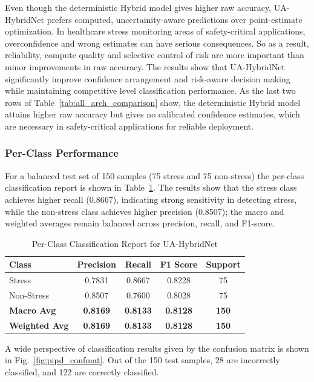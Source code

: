 \documentclass[conference]{IEEEtran}
\begin{document}
Even though the deterministic Hybrid model gives higher raw accuracy, UA-HybridNet prefers computed, uncertainity-aware predictions over point-estimate optimization. In healthcare stress monitoring areas of safety-critical applications, overconfidence and wrong estimates can have serious consequences. So as a result, reliability, compute quality and selective control of risk are more important than minor improvements in raw accuracy. The results show that UA-HybridNet significantly improve confidence arrangement and risk-aware decision making while maintaining competitive level classification performance. As the last two rows of Table~\ref{tab:all_arch_comparison} show, the deterministic Hybrid model attains higher raw accuracy but gives no calibrated confidence estimates, which are necessary in safety-critical applications for reliable deployment.

\subsubsection{Per-Class Performance}
For a balanced test set of 150 samples (75 stress and 75 non-stress) the per-class classification report is shown in Table~\ref{tab:perclass_pipelineD}. The results show that the stress class achieves higher recall (0.8667), indicating strong sensitivity in detecting stress, while the non-stress class achieves higher precision (0.8507); the macro and weighted averages remain balanced across precision, recall, and F1-score.
\begin{table}[tb]
\centering
\caption{Per-Class Classification Report for UA-HybridNet}
\label{tab:perclass_pipelineD}
\footnotesize
\setlength{\tabcolsep}{3pt}
\renewcommand{\arraystretch}{1.0}
\begin{tabular}{lcccc}
\hline
\textbf{Class} & \textbf{Precision} & \textbf{Recall} & \textbf{F1 Score} & \textbf{Support} \\
\hline
Stress     & 0.7831 & 0.8667 & 0.8228 & 75 \\
Non-Stress & 0.8507 & 0.7600 & 0.8028 & 75 \\
\textbf{Macro Avg}    & \textbf{0.8169} & \textbf{0.8133} & \textbf{0.8128} & \textbf{150} \\
\textbf{Weighted Avg} & \textbf{0.8169} & \textbf{0.8133} & \textbf{0.8128} & \textbf{150} \\
\hline
\end{tabular}
\end{table}

A wide perspective of classification results given by the confusion matrix is shown in Fig.~\ref{fig:pipd_confmat}. Out of the 150 test samples, 28 are incorrectly classified, and 122 are correctly classified.
\end{document}
